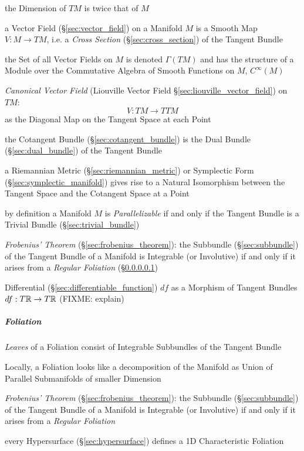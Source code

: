 the Dimension of $T M$ is twice that of $M$

a Vector Field (\S\ref{sec:vector_field}) on a Manifold $M$ is a Smooth Map $V
: M \rightarrow T M$, i.e. a \emph{Cross Section} (\S\ref{sec:cross_section})
of the Tangent Bundle

the Set of all Vector Fields on $M$ is denoted $\Gamma(TM)$ and has the
structure of a Module over the Commutative Algebra of Smooth Functions on $M$,
$C^\infty(M)$

\emph{Canonical Vector Field} (Liouville Vector Field
\S\ref{sec:liouville_vector_field}) on $TM$:
\[
  V : TM \rightarrow TTM
\]
as the Diagonal Map on the Tangent Space at each Point

the Cotangent Bundle (\S\ref{sec:cotangent_bundle}) is the Dual Bundle
(\S\ref{sec:dual_bundle}) of the Tangent Bundle

a Riemannian Metric (\S\ref{sec:riemannian_metric}) or Symplectic Form
(\S\ref{sec:symplectic_manifold}) gives rise to a Natural Isomorphism between
the Tangent Space and the Cotangent Space at a Point

by definition a Manifold $M$ is \emph{Parallelizable} if and only if the
Tangent Bundle is a Trivial Bundle (\S\ref{sec:trivial_bundle})

\emph{Frobenius' Theorem} (\S\ref{sec:frobenius_theorem}): the Subbundle
(\S\ref{sec:subbundle}) of the Tangent Bundle of a Manifold is Integrable (or
Involutive) if and only if it arises from a \emph{Regular Foliation}
(\S\ref{sec:foliation})

Differential (\S\ref{sec:differentiable_function}) $df$ as a Morphism of
Tangent Bundles $df : T\mathbb{R} \rightarrow T\mathbb{R}$ (FIXME: explain)



\subparagraph{Foliation}\label{sec:foliation}\hfill

\emph{Leaves} of a Foliation consist of Integrable Subbundles of the Tangent
Bundle

Locally, a Foliation looks like a decomposition of the Manifold as Union of
Parallel Submanifolds of smaller Dimension

\emph{Frobenius' Theorem} (\S\ref{sec:frobenius_theorem}): the Subbundle
(\S\ref{sec:subbundle}) of the Tangent Bundle of a Manifold is Integrable (or
Involutive) if and only if it arises from a \emph{Regular Foliation}

every Hypersurface (\S\ref{sec:hypersurface}) defines a 1D Characteristic
Foliation



